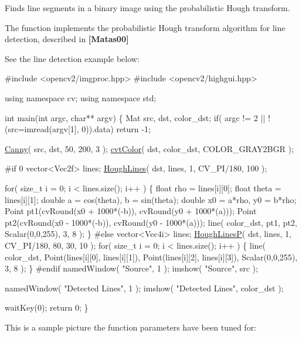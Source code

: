 Finds line segments in a binary image using the probabilistic Hough transform. 

The function implements the probabilistic Hough transform algorithm for line detection, described in {\bfseries [Matas00]} 

See the line detection example below\+: 


\begin{DoxyPre}
\begin{DoxyCode}
\textcolor{preprocessor}{#include <opencv2/imgproc.hpp>}
\textcolor{preprocessor}{#include <opencv2/highgui.hpp>}

\textcolor{keyword}{using namespace }cv;
\textcolor{keyword}{using namespace }std;

\textcolor{keywordtype}{int} main(\textcolor{keywordtype}{int} argc, \textcolor{keywordtype}{char}** argv)
\{
    Mat src, dst, color\_dst;
    \textcolor{keywordflow}{if}( argc != 2 || !(src=imread(argv[1], 0)).data)
        \textcolor{keywordflow}{return} -1;

    \hyperlink{group__imgproc__feature_gae85c4c5d2fd8006e4194e3ee73d2277d}{Canny}( src, dst, 50, 200, 3 );
    \hyperlink{group__imgproc__misc_gaab99985581c43cce9df680e6586cb9ef}{cvtColor}( dst, color\_dst, COLOR\_GRAY2BGR );

\textcolor{preprocessor}{#if 0}
    vector<Vec2f> lines;
    \hyperlink{group__imgproc__feature_ga304555e089d6883caf9ac96ebef50718}{HoughLines}( dst, lines, 1, CV\_PI/180, 100 );

    \textcolor{keywordflow}{for}( \textcolor{keywordtype}{size\_t} i = 0; i < lines.size(); i++ )
    \{
        \textcolor{keywordtype}{float} rho = lines[i][0];
        \textcolor{keywordtype}{float} theta = lines[i][1];
        \textcolor{keywordtype}{double} a = cos(theta), b = sin(theta);
        \textcolor{keywordtype}{double} x0 = a*rho, y0 = b*rho;
        Point pt1(cvRound(x0 + 1000*(-b)),
                  cvRound(y0 + 1000*(a)));
        Point pt2(cvRound(x0 - 1000*(-b)),
                  cvRound(y0 - 1000*(a)));
        line( color\_dst, pt1, pt2, Scalar(0,0,255), 3, 8 );
    \}
\textcolor{preprocessor}{#else}
    vector<Vec4i> lines;
    \hyperlink{group__imgproc__feature_gaac39ae22179f4396e7034f6d2a4cce1e}{HoughLinesP}( dst, lines, 1, CV\_PI/180, 80, 30, 10 );
    \textcolor{keywordflow}{for}( \textcolor{keywordtype}{size\_t} i = 0; i < lines.size(); i++ )
    \{
        line( color\_dst, Point(lines[i][0], lines[i][1]),
            Point(lines[i][2], lines[i][3]), Scalar(0,0,255), 3, 8 );
    \}
\textcolor{preprocessor}{#endif}
    namedWindow( \textcolor{stringliteral}{"Source"}, 1 );
    imshow( \textcolor{stringliteral}{"Source"}, src );

    namedWindow( \textcolor{stringliteral}{"Detected Lines"}, 1 );
    imshow( \textcolor{stringliteral}{"Detected Lines"}, color\_dst );

    waitKey(0);
    \textcolor{keywordflow}{return} 0;
\}
\end{DoxyCode}
 \end{DoxyPre}
 This is a sample picture the function parameters have been tuned for\+: 

